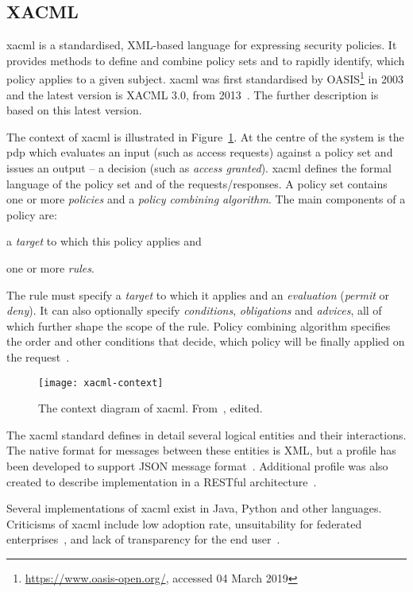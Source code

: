 \subsection{XACML}\label{sec:xacml}

 \acrfull{xacml} is a standardised, XML-based language for expressing security policies. It provides methods to define and combine policy sets and to rapidly identify, which policy applies to a given subject. \acrshort{xacml} was first standardised by OASIS\footnote{\url{https://www.oasis-open.org/}, accessed 04 March 2019} in 2003 and the latest version is XACML 3.0, from 2013~\cite{OASISStandard2013EXtensible3.0}. The further description is based on this latest version.
 
The context of \acrshort{xacml} is illustrated in Figure~\ref{fig:xacml-context}. At the centre of the system is the \acrfull{pdp} which evaluates an input (such as access requests) against a policy set and issues an output -- a decision (such as \textit{access granted}). \acrshort{xacml} defines the formal language of the policy set and of the requests/responses. A policy set contains one or more \textit{policies} and a \textit{policy combining algorithm}. The main components of a policy are:
% 
\begin{enumerate*}[label=(\roman*)]
    \item a \textit{target} to which this policy applies and
    \item one or more \textit{rules}.
\end{enumerate*} 
% 
The rule must specify a \textit{target} to which it applies and an \textit{evaluation} (\textit{permit} or \textit{deny}). It can also optionally specify \textit{conditions}, \textit{obligations} and \textit{advices}, all of which further shape the scope of the rule. Policy combining algorithm specifies the order and other conditions that decide, which policy will be finally applied on the request~\cite{OASISStandard2013EXtensible3.0}.
 
 \begin{figure}[ht]
    \centering
    \texttt{[image: xacml-context]}
    \caption{The context diagram of \acrshort{xacml}. From~\cite{OASISStandard2013EXtensible3.0}, edited.}
    \label{fig:xacml-context}
\end{figure}
 
The \acrshort{xacml} standard defines in detail several logical entities and their interactions. The native format for messages between these entities is XML, but a profile has been developed to support JSON message format~\cite{2017JSON1.0}. Additional profile was also created to describe implementation in a RESTful architecture~\cite{2017REST1.0}.
 
 Several implementations of \acrshort{xacml} exist in Java, Python and other languages. Criticisms of \acrshort{xacml} include low adoption rate, unsuitability for federated enterprises~\cite{Cser2013XACMLDead}, and lack of transparency for the end user~\cite{Cser2013XACMLDead, Ardagna2011ExpressiveApplications}.

